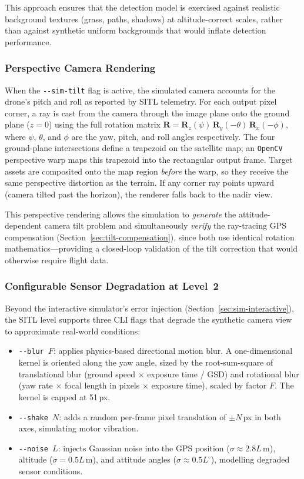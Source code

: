 This approach ensures that the detection model is exercised against realistic background textures (grass, paths, shadows) at altitude-correct scales, rather than against synthetic uniform backgrounds that would inflate detection performance.

\subsubsection{Perspective Camera Rendering}

When the \texttt{-{}-sim-tilt} flag is active, the simulated camera accounts for the drone's pitch and roll as reported by SITL telemetry.  For each output pixel corner, a ray is cast from the camera through the image plane onto the ground plane ($z = 0$) using the full rotation matrix $\mathbf{R} = \mathbf{R}_z(\psi)\,\mathbf{R}_y(-\theta)\,\mathbf{R}_x(-\phi)$, where $\psi$, $\theta$, and $\phi$ are the yaw, pitch, and roll angles respectively.  The four ground-plane intersections define a trapezoid on the satellite map; an \texttt{OpenCV} perspective warp maps this trapezoid into the rectangular output frame.  Target assets are composited onto the map region \emph{before} the warp, so they receive the same perspective distortion as the terrain.  If any corner ray points upward (camera tilted past the horizon), the renderer falls back to the nadir view.

This perspective rendering allows the simulation to \emph{generate} the attitude-dependent camera tilt problem and simultaneously \emph{verify} the ray-tracing GPS compensation (Section~\ref{sec:tilt-compensation}), since both use identical rotation mathematics---providing a closed-loop validation of the tilt correction that would otherwise require flight data.

\subsubsection{Configurable Sensor Degradation at Level~2}

Beyond the interactive simulator's error injection (Section~\ref{sec:sim-interactive}), the SITL level supports three CLI flags that degrade the synthetic camera view to approximate real-world conditions:

\begin{itemize}
    \item \texttt{-{}-blur $F$}: applies physics-based directional motion blur.  A one-dimensional kernel is oriented along the yaw angle, sized by the root-sum-square of translational blur (ground speed $\times$ exposure time / GSD) and rotational blur (yaw rate $\times$ focal length in pixels $\times$ exposure time), scaled by factor $F$.  The kernel is capped at 51\,px.
    \item \texttt{-{}-shake $N$}: adds a random per-frame pixel translation of $\pm N$\,px in both axes, simulating motor vibration.
    \item \texttt{-{}-noise $L$}: injects Gaussian noise into the GPS position ($\sigma \approx 2.8L$\,m), altitude ($\sigma = 0.5L$\,m), and attitude angles ($\sigma \approx 0.5L^{\circ}$), modelling degraded sensor conditions.
\end{itemize}


